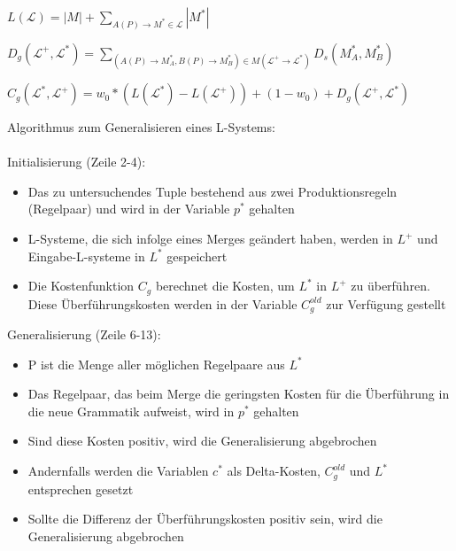 \begin{algorithm}[caption={Längenfunktion $L$ für Grammatiken}]
    $L(\mathcal{L}) = |M| + \sum\limits_{A(P) \rightarrow M^* \in \mathcal{L}} |M^*|$
\end{algorithm}

\begin{algorithm}[caption={Grammar Edit Distance}]
    $D_g(\mathcal{L}^+, \mathcal{L}^*)= \sum\limits_{(A(P) \rightarrow M^*_A , B(P) \rightarrow M^*_B) \in M(\mathcal{L^+} \rightarrow \mathcal{L^*})} D_s(M^*_A, M^*_B)$
\end{algorithm}

\begin{algorithm}[caption={Kostenfunktion $C_g$ mit Gewichtung $w_0$}]
    $C_g(\mathcal{L}^*, \mathcal{L}^+) = w_0 * (L(\mathcal{L}^*) - L(\mathcal{L}^+)) + (1 - w_0) + D_g(\mathcal{L}^+, \mathcal{L}^*)$
\end{algorithm}

Algorithmus zum Generalisieren eines L-Systems:\\~\\
Initialisierung (Zeile 2-4):
\begin{itemize}
    \item Das zu untersuchendes Tuple bestehend aus zwei Produktionsregeln (Regelpaar) und wird in der Variable $p^*$ gehalten
    \item L-Systeme, die sich infolge eines Merges geändert haben, werden in $L^+$ und Eingabe-L-systeme in $L^*$ gespeichert
    \item Die Kostenfunktion $C_g$ berechnet die Kosten, um $L^*$ in $L^+$ zu überführen. Diese Überführungskosten werden
    in der Variable $C^{old}_g$ zur Verfügung gestellt
\end{itemize}
Generalisierung (Zeile 6-13):
\begin{itemize}
    \item P ist die Menge aller möglichen Regelpaare aus $L^*$
    \item Das Regelpaar, das beim Merge die geringsten Kosten für die Überführung in die neue Grammatik aufweist, wird in
    $p^*$ gehalten
    \item Sind diese Kosten positiv, wird die Generalisierung abgebrochen
    \item Andernfalls werden die Variablen $c^*$ als Delta-Kosten, $C^{old}_g$ und $L^*$ entsprechen gesetzt
    \item Sollte die Differenz der Überführungskosten positiv sein, wird die Generalisierung abgebrochen
\end{itemize}

